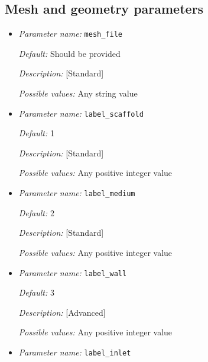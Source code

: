 \subsection{Mesh and geometry parameters}
\label{parameters:mesh}

\begin{itemize}
\item {\it Parameter name:} {\tt mesh\_file}
\label{parameters:mesh_file}


{\it Default:} Should be provided

{\it Description:} [Standard] 

{\it Possible values:} Any string value 


\item {\it Parameter name:} {\tt label\_scaffold}
\label{parameters:label_scaffold}


{\it Default:} 1

{\it Description:} [Standard] 

{\it Possible values:} Any positive integer value 


\item {\it Parameter name:} {\tt label\_medium}
\label{parameters:label_medium}


{\it Default:} 2

{\it Description:} [Standard] 

{\it Possible values:} Any positive integer value 


\item {\it Parameter name:} {\tt label\_wall}
\label{parameters:label_wall}


{\it Default:} 3

{\it Description:} [Advanced] 

{\it Possible values:} Any positive integer value 


\item {\it Parameter name:} {\tt label\_inlet}
\label{parameters:label_inlet}



\end{itemize}
